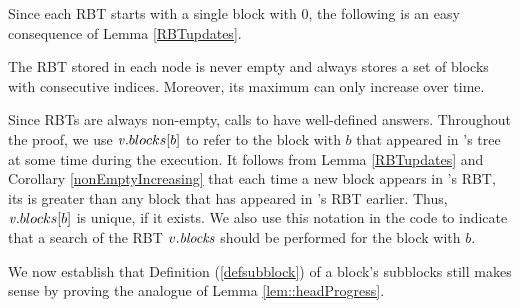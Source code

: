 Since each RBT starts with a single block with  0, the following is an easy consequence of Lemma \ref{RBTupdates}.
\begin{corollary}\label{nonEmptyIncreasing}
The RBT stored in each node  is never empty and always stores a set of blocks with consecutive indices.
Moreover, its maximum  can only increase over time.
\end{corollary}

Since RBTs are always non-empty, calls to  have well-defined answers.  
Throughout the proof, we use $\mbox{\textnormal{\textit{v}}}.blocks[b]$ to refer to the block with  $b$ that appeared
in 's tree at some time during the execution.
It follows from Lemma \ref{RBTupdates} and Corollary \ref{nonEmptyIncreasing} that 
each time a new block appears in 's RBT, its  is greater than any block
that has appeared in 's RBT earlier.
Thus, $\mbox{\textnormal{\textit{v}}}.blocks[b]$ is unique, if it exists.
We also use this notation in the code to indicate that a search of the RBT $v.\mbox{\textit{blocks}}$ should be performed for the block
with  $b$.

We now establish that Definition (\ref{defsubblock}) of a block's subblocks
still makes sense by proving the analogue of Lemma \ref{lem::headProgress}.



